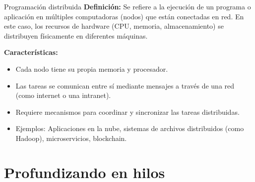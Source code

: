 \documentclass{beamer}
\begin{document}
\begin{frame}{Programación distribuida}
\textbf{Definición: }Se refiere a la ejecución de un programa o aplicación en múltiples computadoras (nodos) que están conectadas en red. En este caso, los recursos de hardware (CPU, memoria, almacenamiento) se distribuyen físicamente en diferentes máquinas.


\textbf{Características:}
    \begin{itemize}
        \item Cada nodo tiene su propia memoria y procesador.
        \item Las tareas se comunican entre sí mediante mensajes a través de una red (como internet o una intranet).
        \item Requiere mecanismos para coordinar y sincronizar las tareas distribuidas.
        \item Ejemplos: Aplicaciones en la nube, sistemas de archivos distribuidos (como Hadoop), microservicios, blockchain.
    \end{itemize}
\end{frame}

\section{Profundizando en hilos}
\end{document}
